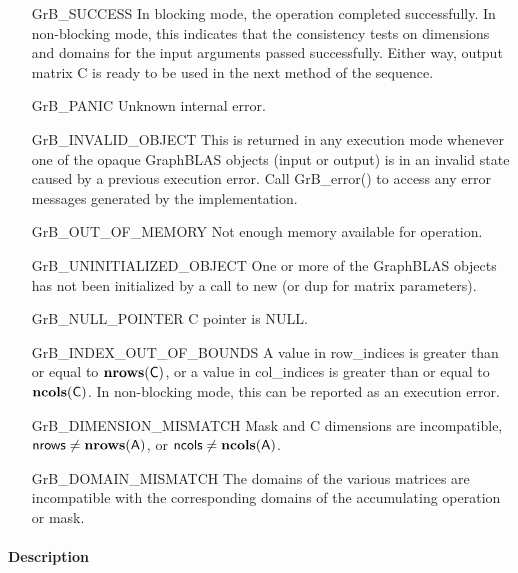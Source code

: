 \begin{itemize}[leftmargin=2.1in]
    \item[{\sf GrB\_SUCCESS}]         In blocking mode, the operation completed
    successfully. In non-blocking mode, this indicates that the consistency 
    tests on dimensions and domains for the input arguments passed successfully. 
    Either way, output matrix {\sf C} is ready to be used in the next method of 
    the sequence.

    \item[{\sf GrB\_PANIC}]           Unknown internal error.
    
    \item[{\sf GrB\_INVALID\_OBJECT}] This is returned in any execution mode 
    whenever one of the opaque GraphBLAS objects (input or output) is in an invalid 
    state caused by a previous execution error.  Call {GrB\_error()} to access 
    any error messages generated by the implementation.

    \item[{\sf GrB\_OUT\_OF\_MEMORY}]  Not enough memory available for operation.

    \item[{\sf GrB\_UNINITIALIZED\_OBJECT}] One or more of the GraphBLAS objects 
    has not been initialized by a call to {\sf new} (or {\sf dup} for matrix
    parameters).

    \item[{\sf GrB\_NULL\_POINTER}]  {\sf C} pointer is {\sf NULL}.

    \item[{\sf GrB\_INDEX\_OUT\_OF\_BOUNDS}]  A value in {\sf row\_indices} 
    is greater than or equal to $\bold{nrows}({\sf C})$, or a value in 
    {\sf col\_indices} is greater than or equal to $\bold{ncols}({\sf C})$.  In 
    non-blocking mode, this can be reported as an execution error.
    
    \item[{\sf GrB\_DIMENSION\_MISMATCH}] {\sf Mask} and {\sf C} dimensions are
    incompatible, ${\sf nrows} \neq \bold{nrows}({\sf A})$, or 
    ${\sf ncols} \neq \bold{ncols}({\sf A})$.

    \item[{\sf GrB\_DOMAIN\_MISMATCH}]     The domains of the various matrices
    are incompatible with the corresponding domains of the accumulating 
    operation or mask.
\end{itemize}

\paragraph{Description}

